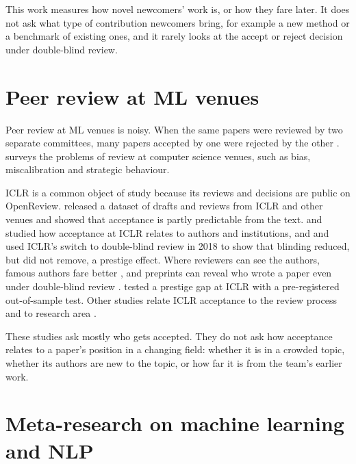 This work measures how novel newcomers' work is, or how they fare later. It does not ask what type of contribution
newcomers bring, for example a new method or a benchmark of existing ones, and it rarely looks at the accept or reject
decision under double-blind review.

\section{Peer review at ML venues}
\label{sec:lit-review}

Peer review at ML venues is noisy. When the same papers were reviewed by two separate committees, many papers accepted
by one were rejected by the other \citep{cortes2021inconsistency,beygelzimer2023has}. \citet{shah2022challenges}
surveys the problems of review at computer science venues, such as bias, miscalibration and strategic behaviour.

ICLR is a common object of study because its reviews and decisions are public on OpenReview. \citet{kang2018dataset}
released a dataset of drafts and reviews from ICLR and other venues and showed that acceptance is partly predictable
from the text. \citet{tran2020open} and \citet{zhang2022investigating} studied how acceptance at ICLR relates to authors
and institutions, and \citet{sun2022does} and \citet{manzoor2021uncovering} used ICLR's switch to double-blind review in
2018 to show that blinding reduced, but did not remove, a prestige effect. Where reviewers can see the authors, famous
authors fare better \citep{tomkins2017reviewer}, and preprints can reveal who wrote a paper even under double-blind
review \citep{bharadhwaj2020deanonymization}. \citet{ibrahim2026bias} tested a prestige gap at ICLR with a pre-registered
out-of-sample test. Other studies relate ICLR acceptance to the review process \citep{jung2025what} and to research
area \citep{wang2023what,xu2026reviewer}.

These studies ask mostly who gets accepted. They do not ask how acceptance relates to a paper's position in a changing
field: whether it is in a crowded topic, whether its authors are new to the topic, or how far it is from the team's
earlier work.

\section{Meta-research on machine learning and NLP}
\label{sec:lit-ml}

